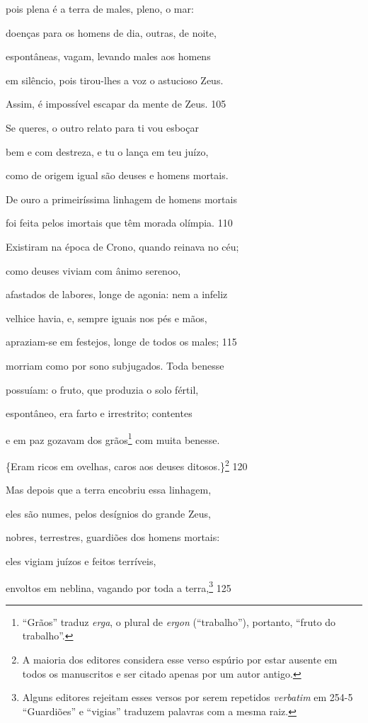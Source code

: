 pois plena é a terra de males, pleno, o mar:

doenças para os homens de dia, outras, de noite,

espontâneas, vagam, levando males aos homens

em silêncio, pois tirou-lhes a voz o astucioso Zeus.

Assim, é impossível escapar da mente de Zeus. \num{105}

Se queres, o outro relato para ti vou esboçar

bem e com destreza, e tu o lança em teu juízo,

como de origem igual são deuses e homens mortais.

De ouro a primeiríssima linhagem de homens mortais

foi feita pelos imortais que têm morada olímpia. \num{110}

Existiram na época de Crono, quando reinava no céu;

como deuses viviam com ânimo serenoo,

afastados de labores, longe de agonia: nem a infeliz

velhice havia, e, sempre iguais nos pés e mãos,

apraziam-se em festejos, longe de todos os males; \num{115}

morriam como por sono subjugados. Toda benesse

possuíam: o fruto, que produzia o solo fértil,

espontâneo, era farto e irrestrito; contentes

e em paz gozavam dos grãos\footnote{``Grãos'' traduz \emph{erga}, o plural de \emph{ergon} (``trabalho''), portanto, ``fruto do trabalho''.} com muita benesse.

\{Eram ricos em ovelhas, caros aos deuses ditosos.\}\footnote{A maioria dos editores considera esse verso espúrio por estar
ausente em todos os manuscritos e ser citado apenas por um autor antigo.} \num{120}

Mas depois que a terra encobriu essa linhagem,

eles são numes, pelos desígnios do grande Zeus,

nobres, terrestres, guardiões dos homens mortais:

eles vigiam juízos e feitos terríveis,

envoltos em neblina, vagando por toda a terra,\footnote{Alguns editores rejeitam esses versos por serem repetidos \emph{verbatim} em 254-5 ``Guardiões'' e ``vigias'' traduzem palavras com a mesma raiz.} \num{125}

